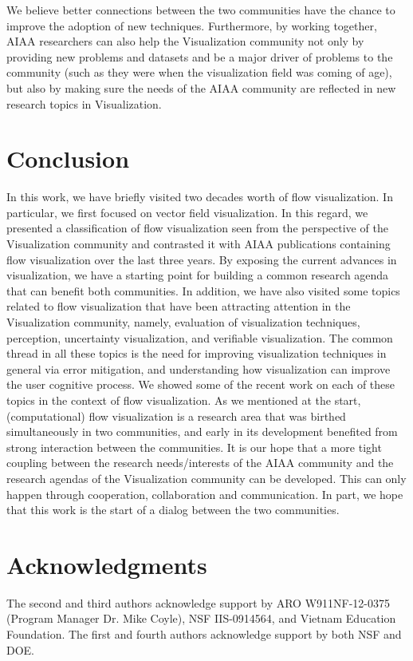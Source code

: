 We believe better connections between the two communities have the
chance to improve the adoption of new techniques.  Furthermore, by
working together, AIAA researchers can also help the Visualization community not
only by providing new problems and datasets and be a major driver of
problems to the community (such as they were when the visualization
field was coming of age), but also by making sure the needs of the
AIAA community are reflected in new research topics in Visualization.


\section{Conclusion}
\label{sec:conclusions}

In this work, we have briefly visited two decades worth of flow visualization.
%
In particular, we first focused on vector field visualization. In this regard, we presented a classification of flow visualization seen from the perspective of the Visualization community and contrasted it with AIAA publications containing flow visualization over the last three years. By exposing the current advances in visualization, we have a starting point for building a common research agenda that can benefit both communities.
%
In addition, we have also visited some topics related to flow visualization that have been attracting attention  in the Visualization community, namely, evaluation of visualization techniques, perception, uncertainty visualization, and verifiable visualization.  The common thread in all these topics is the need for improving  visualization techniques in general via error mitigation, and understanding how visualization can improve the user cognitive process. We showed some of the recent work on each of these topics in the context of flow visualization.
%
As we mentioned at the start, (computational) flow visualization is a research area that was birthed simultaneously in
two communities, and early in its development benefited from strong interaction between the communities.  It is our hope
that a more tight coupling between the research needs/interests of the AIAA community and the research agendas of the
Visualization community can be developed.  This can only happen through cooperation, collaboration and communication.  
In part, we hope that this work is the start of a dialog between the two communities.

\section*{Acknowledgments}

The second and third authors acknowledge support by ARO
W911NF-12-0375 (Program Manager Dr. Mike Coyle),
NSF IIS-0914564, and Vietnam Education Foundation.
The first and fourth authors acknowledge support by both NSF and DOE.
